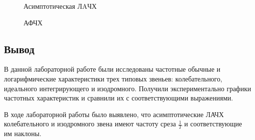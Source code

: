 \documentclass[a4paper, 12pt]{article}
\begin{document}
\newpage

\begin{figure}[h!]
	\caption{Асимптотическая ЛAЧХ}
	\label{3alachh}
\end{figure}
\begin{figure}[h!]
	\caption{АФЧХ}
	\label{3afchh}
\end{figure}

\newpage

\begin{center}
	\section*{Вывод}
\end{center}\par
В данной лабораторной работе были исследованы частотные обычные и логарифмические характеристики трех типовых звеньев: колебательного, идеального интегрирующего и изодромного. Получили экспериментально графики частотных характеристик и сравнили их с соответствующими выражениями. \par
В ходе лабораторной работы было выявлено, что асимптотические ЛАЧХ колебательного и изодромного звена имеют частоту среза $\frac{1}{T}$ и соответствующие им наклоны.
\end{document}
